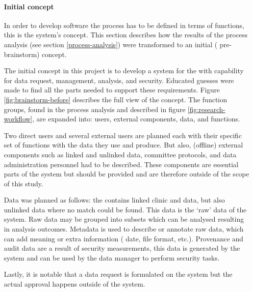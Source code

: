 \paragraph{Initial concept}
In order to develop software the process has to be defined in terms of functions, this is the system's concept.
This section describes how the results of the process analysis (see section \ref{process-analysis}) were transformed to an initial (\ie{} pre-brainstorm) concept.

The initial concept in this project is to develop a system for the \projectdata{} with capability for data request, management, analysis, and security.
Educated guesses were made to find all the parts needed to support these requirements.
Figure \ref{fig:brainstorm-before} describes the full view of the concept. 
The function groups, found in the process analysis and described in figure \ref{fig:research-workflow}, are expanded into: users, external components, data, and functions.

Two direct users and several external users are planned each with their specific set of functions with the data they use and produce.
But also, (offline) external components such as linked and unlinked data, committee protocols, and data administration personnel had to be described.
These components are essential parts of the system but should be provided and are therefore outside of the scope of this study.

Data was planned as follows: the \projectdata{} contains linked clinic and \PRN{} data, but also unlinked data where no match could be found.
This data is the `raw' data of the system.
Raw data may be grouped into subsets which can be analysed resulting in analysis outcomes.
Metadata is used to describe or annotate raw data, which can add meaning or extra information (\eg{} date, file format, etc.).
Provenance and audit data are a result of security measurements, this data is generated by the system and can be used by the data manager to perform security tasks.

Lastly, it is notable that a data request is formulated on the system but the actual approval happens outside of the system.


